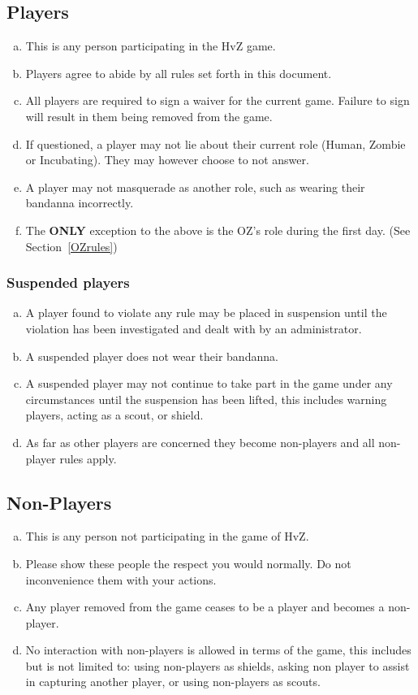 \documentclass[a4paper,12pt]{article}
\begin{document}
\subsection{Players}

\begin{enumerate}[(a)]
    \item This is any person participating in the HvZ game.
    \item Players agree to abide by all rules set forth in this document.
    \item All players are required to sign a waiver for the current game. Failure to sign will result in them being removed from the game. 
    \item If questioned, a player may not lie about their current role (Human, Zombie or Incubating). They may however choose to not answer. 
    \item A player may not masquerade as another role, such as wearing their bandanna incorrectly.
    \item The {\bf ONLY} exception to the above is the OZ's role during the first day. (See Section~\ref{OZrules})
\end{enumerate}

\subsubsection{Suspended players}

\begin{enumerate}[(a)]
    \item A player found to violate any rule may be placed in suspension until the violation has been investigated and dealt with by an administrator.
    \item A suspended player does not wear their bandanna.
    \item A suspended player may not continue to take part in the game under any circumstances until the suspension has been lifted, this includes warning players, acting as a scout, or shield.
    \item As far as other players are concerned they become non-players and all non-player rules apply.
\end{enumerate}


\subsection{Non-Players}
\begin{enumerate}[(a)]
    \item This is any person not participating in the game of HvZ.
    \item Please show these people the respect you would normally. Do not inconvenience them with your actions.
    \item Any player removed from the game ceases to be a player and becomes a non-player. 
    \item No interaction with non-players is allowed in terms of the game, this includes but is not limited to: using non-players as shields, asking non player to assist in capturing another player, or using non-players  as scouts.
\end{enumerate}
\end{document}
